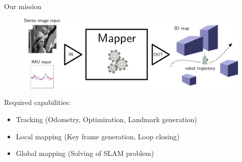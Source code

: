 \documentclass[11pt]{beamer}
\begin{document}
\begin{frame}{Our mission}
\begin{figure}[!htb]
\centering
\includegraphics[width=\textwidth]{figures/introduction/basic_concept.pdf}
\end{figure}
Required capabilities:
\begin{itemize}
\item Tracking (Odometry, Optimization, Landmark generation)
\item Local mapping (Key frame generation, Loop closing)
\item Global mapping (Solving of SLAM problem)
\end{itemize}
\end{frame}
\end{document}
